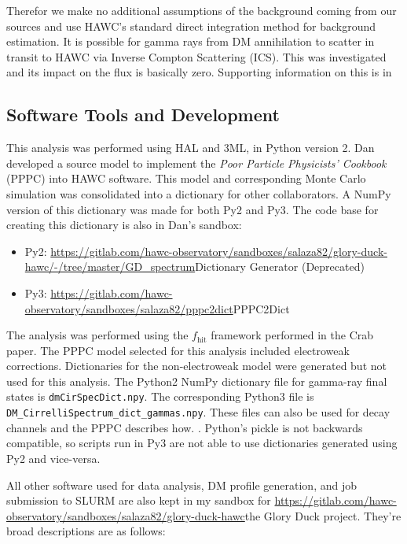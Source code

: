 Therefor we make no additional assumptions of the background coming from our sources and use HAWC's standard direct integration method for background estimation.
It is possible for gamma rays from DM annihilation to scatter in transit to HAWC via Inverse Compton Scattering (ICS).
This was investigated and its impact on the flux is basically zero.
Supporting information on this is in 

\subsection{Software Tools and Development}

This analysis was performed using HAL and 3ML, in Python version 2.\cite{Abeysekara_2017, vianello2015multimission}
Dan developed a source model to implement the \emph{Poor Particle Physicists' Cookbook} (PPPC) \cite{Cirelli_2011} into HAWC software.
This model and corresponding Monte Carlo simulation was consolidated into a dictionary for other collaborators.
A NumPy version of this dictionary was made for both Py2 and Py3.
The code base for creating this dictionary is also in Dan's sandbox:

\begin{itemize}
    \item Py2: \url{https://gitlab.com/hawc-observatory/sandboxes/salaza82/glory-duck-hawc/-/tree/master/GD_spectrum}{Dictionary Generator (Deprecated)}
    \item Py3: \url{https://gitlab.com/hawc-observatory/sandboxes/salaza82/pppc2dict}{PPPC2Dict}
\end{itemize}

The analysis was performed using the $f_{\textrm{hit}}$ framework performed in the Crab paper\cite{Abeysekara_2017}.
The PPPC model selected for this analysis included electroweak corrections.
Dictionaries for the non-electroweak model were generated but not used for this analysis.
The Python2 NumPy dictionary file for gamma-ray final states is \texttt{dmCirSpecDict.npy}.
The corresponding Python3 file is \texttt{DM\_CirrelliSpectrum\_dict\_gammas.npy}.
These files can also be used for decay channels and the PPPC describes how. \cite{Cirelli_2011}.
Python's pickle is not backwards compatible, so scripts run in Py3 are not able to use dictionaries generated using Py2 and vice-versa.

All other software used for data analysis, DM profile generation, and job submission to SLURM are also kept in my sandbox for \url{https://gitlab.com/hawc-observatory/sandboxes/salaza82/glory-duck-hawc}{the Glory Duck} project. They're broad descriptions are as follows:

